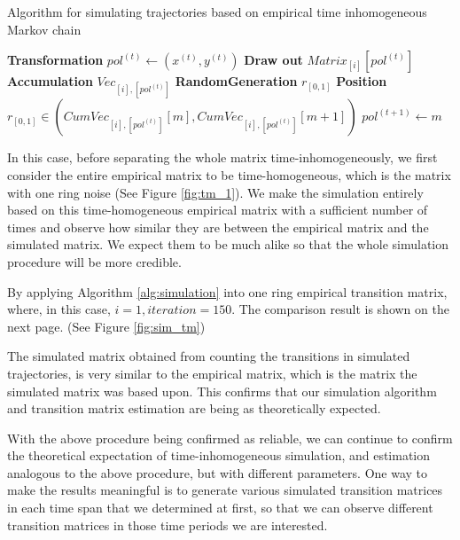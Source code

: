 \documentclass[12pt]{article}
\theoremstyle{definition}
\begin{document}
\begin{algorithm}
  \caption{Algorithm for simulating trajectories based on empirical time inhomogeneous Markov chain}
  \label{alg:simulation}
  \begin{algorithmic}
    \State \textbf{Transformation} \(pol^{(t)} \gets (x^{(t)},y^{(t)})\) 
    \State \textbf{Draw out} \(Matrix_{[i]}[pol^{(t)}]\) 
    \State {}
    \State \textbf{Accumulation} \(Vec_{[i],[pol^{(t)}]}\) 
    \State {}
    \State \textbf{RandomGeneration} \(r_{[0,1]}\)
    \State {}
    \State \textbf{Position} \(r_{[0,1]} \in (CumVec_{[i],[pol^{(t)}]}[m],CumVec_{[i],[pol^{(t)}]}[m+1])\)
    \State {}
    \State \(pol^{(t+1)} \gets m\) 
    \EndFor
    \EndFor
    \EndProcedure
  \end{algorithmic}
\end{algorithm}

\newpage

In this case, before separating the whole matrix time-inhomogeneously, we first consider the entire empirical matrix to be time-homogeneous, which is the matrix with one ring noise (See Figure \ref{fig:tm_1}). We make the simulation entirely based on this time-homogeneous empirical matrix with a sufficient number of times and observe how similar they are between the empirical matrix and the simulated matrix. We expect them to be much alike so that the whole simulation procedure will be more credible. 

By applying Algorithm \ref{alg:simulation} into one ring empirical transition matrix, where, in this case, \(i = 1, iteration = 150\). The comparison result is shown on the next page. (See Figure \ref{fig:sim_tm})

The simulated matrix obtained from counting the transitions in simulated trajectories, is very similar to the empirical matrix, which is the matrix the simulated matrix was based upon. This confirms that our simulation algorithm and transition matrix estimation are being as theoretically expected. 

With the above procedure being confirmed as reliable, we can continue to confirm the theoretical expectation of time-inhomogeneous simulation, and estimation analogous to the above procedure, but with different parameters. One way to make the results meaningful is to generate various simulated transition matrices in each time span that we determined at first, so that we can observe different transition matrices in those time periods we are interested. 
\end{document}
